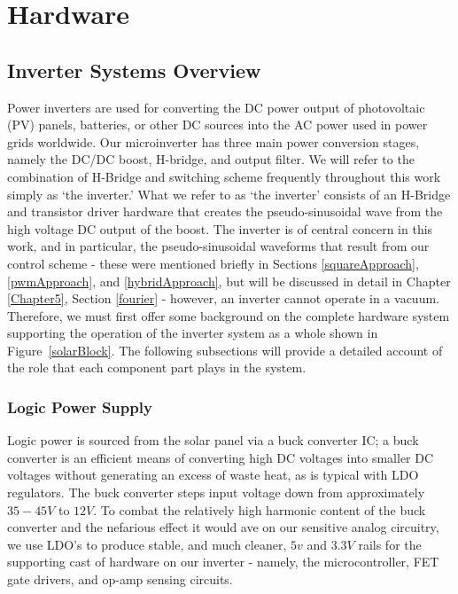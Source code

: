 
\chapter{Hardware} %

\label{hardware} %



\section{Inverter Systems Overview}

Power inverters are used for converting the DC power output of photovoltaic (PV) panels, batteries, or other DC sources into the AC power used in power grids worldwide. Our microinverter has three main power conversion stages, namely the DC/DC boost, H-bridge, and output filter. We will refer to the combination of H-Bridge and switching scheme frequently throughout this work simply as `the inverter.'  What we refer to as `the inverter' consists of an H-Bridge and transistor driver hardware that creates the pseudo-sinusoidal wave from the high voltage DC output of the boost. The inverter is of central concern in this work, and in particular, the pseudo-sinusoidal waveforms that result from our control scheme - these were mentioned briefly in Sections \ref{squareApproach}, \ref{pwmApproach}, and \ref{hybridApproach}, but will be discussed in detail in Chapter \ref{Chapter5}, Section \ref{fourier} - however, an inverter cannot operate in a vacuum. Therefore, we must first offer some background on the complete hardware system supporting the operation of the inverter system as a whole shown in Figure~\ref{solarBlock}. The following subsections will provide a detailed account of the role that each component part plays in the system.

\subsection{Logic Power Supply}

Logic power is sourced from the solar panel via a buck converter IC; a buck converter is an efficient means of converting high DC voltages into smaller DC voltages without generating an excess of waste heat, as is typical with LDO regulators. The buck converter steps input voltage down from approximately $35-45V$ to $12V$. To combat the relatively high harmonic content of the buck converter and the nefarious effect it would ave on our sensitive analog circuitry, we use LDO's to produce stable, and much cleaner, $5v$ and $3.3V$ rails for the supporting cast of hardware on our inverter - namely, the microcontroller, FET gate drivers, and op-amp sensing circuits. 

